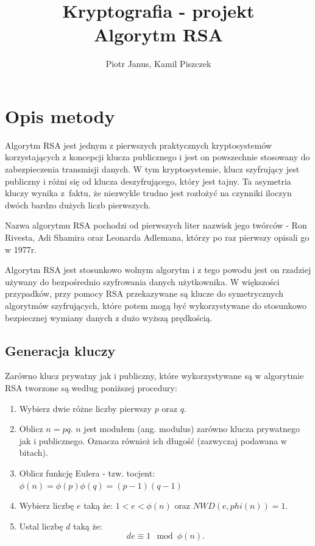 \documentclass[10pt,a4paper]{article}
\begin{document}
	\title{Kryptografia - projekt  \\  Algorytm RSA}
	\author{Piotr Janus, Kamil Piszczek}
	\date{}
	\maketitle

\section{Opis metody}
Algorytm RSA jest jednym z pierwszych praktycznych kryptosystemów korzystających z koncepcji klucza publicznego i jest on powszechnie stosowany do zabezpieczenia transmisji danych. W tym kryptosystemie, klucz szyfrujący jest publiczny i różni się od klucza deszyfrującego, który jest tajny. Ta asymetria kluczy wynika z~faktu, że niezwykle trudno jest rozłożyć na czynniki iloczyn dwóch bardzo dużych liczb pierwszych. 

Nazwa algorytmu RSA pochodzi od pierwszych liter nazwisk jego twórców - Ron Rivesta, Adi Shamira oraz Leonarda Adlemana, którzy po raz pierwszy opisali go w 1977r.

Algorytm RSA jest stosunkowo wolnym algorytm i z tego powodu jest on rzadziej używany do bezpośrednio szyfrowania danych użytkownika. W większości przypadków, przy pomocy RSA przekazywane są klucze do symetrycznych algorytmów szyfrujących, które potem mogą być wykorzystywane do stosunkowo bezpiecznej wymiany danych z dużo wyższą prędkością.

\subsection{Generacja kluczy} \label{key_gen}

Zarówno klucz prywatny jak i publiczny, które wykorzystywane są w algorytmie RSA tworzone są według poniższej procedury:

\begin{enumerate}
\item Wybierz dwie różne liczby pierwszy $p$ oraz $q$.
\item Oblicz $n = pq$. $n$ jest modułem (ang. modulus) zarówno klucza prywatnego jak i publicznego. Oznacza również ich długość (zazwyczaj podawana w bitach).
\item Oblicz funkcję Eulera - tzw. tocjent: $\phi(n) = \phi(p) \phi(q) = (p-1)(q-1)$
\item Wybierz liczbę $e$ taką że: $1<e<\phi(n)$ oraz $NWD(e,phi(n))=1$.
\item Ustal liczbę $d$ taką że:
\begin{equation} \label{ed_cond_eq}
d e \equiv 1 \mod \phi(n).
\end{equation}
\end{enumerate}
\end{document}
